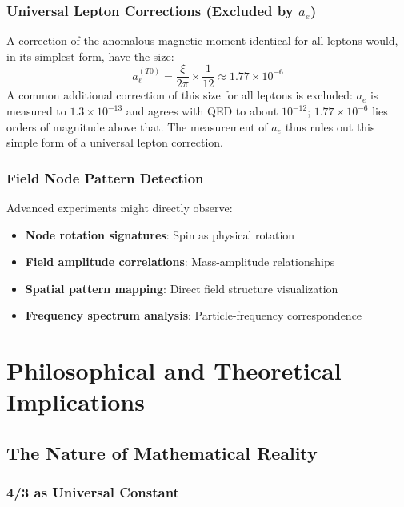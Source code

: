 	\subsubsection{Universal Lepton Corrections (Excluded by $a_e$)}
	\label{subsubsec:universal_lepton_corrections}
	
	A correction of the anomalous magnetic moment identical for all leptons would, in its simplest form, have the size:
	\begin{equation}
		a_{\ell}^{(T0)} = \frac{\xi}{2\pi} \times \frac{1}{12} \approx 1.77 \times 10^{-6}
		\label{eq:universal_lepton_prediction}
	\end{equation}
	A common additional correction of this size for all leptons is excluded: $a_e$ is measured to $1.3\times10^{-13}$ and agrees with QED to about $10^{-12}$; $1.77\times10^{-6}$ lies orders of magnitude above that. The measurement of $a_e$ thus rules out this simple form of a universal lepton correction.
	
	\subsubsection{Field Node Pattern Detection}
	\label{subsubsec:node_pattern_detection}
	
	Advanced experiments might directly observe:
	\begin{itemize}
		\item \textbf{Node rotation signatures}: Spin as physical rotation
		\item \textbf{Field amplitude correlations}: Mass-amplitude relationships
		\item \textbf{Spatial pattern mapping}: Direct field structure visualization
		\item \textbf{Frequency spectrum analysis}: Particle-frequency correspondence
	\end{itemize}
	
	\section{Philosophical and Theoretical Implications}
	\label{sec:philosophical_implications}
	
	\subsection{The Nature of Mathematical Reality}
	\label{subsec:mathematical_reality}
	
	\subsubsection{4/3 as Universal Constant}
	\label{subsubsec:four_thirds_universal}
	
